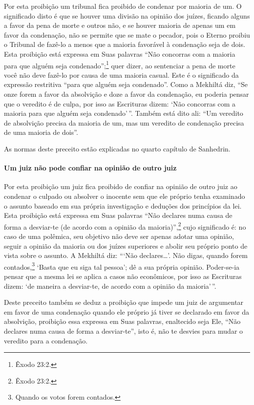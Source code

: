 Por esta proibição um tribunal fica proibido de condenar por maioria de
um. O significado disto é que se houver uma divisão na opinião dos
juízes, ficando alguns a favor da pena de morte e outros não, e se
houver maioria de apenas um em favor da condenação, não se permite que
se mate o pecador, pois o Eterno proibiu o Tribunal de fazê-lo a menos
que a maioria favorável à condenação seja de dois. Esta proibição está
expressa em Suas palavras ``Não concorras com a maioria para que alguém
seja condenado'';\footnote{Êxodo 23:2.} quer dizer, ao sentenciar a pena de morte
você não deve fazê-lo por causa de uma maioria casual. Este é o
significado da expressão restritiva ``para que alguém seja condenado''.
Como a Mekhiltá diz, ``Se onze forem a favor da absolvição e doze a
favor da condenação, eu poderia pensar que o veredito é de culpa, por
isso as Escrituras dizem: `Não concorras com a maioria para que alguém
seja condenado'\,''. Também está dito ali: ``Um veredito de absolvição
precisa da maioria de um, mas um veredito de condenação precisa de uma
maioria de dois''.

As normas deste preceito estão explicadas no quarto capítulo de Sanhedrin.

\paragraph{Um juiz não pode confiar na opinião de outro juiz}

Por esta proibição um juiz fica proibido de confiar na opinião de outro
juiz ao condenar o culpado ou absolver o inocente sem que ele próprio
tenha examinado o assunto baseado em sua própria investigação e deduções
dos princípios da lei. Esta proibição está expressa em Suas palavras
``Não declares numa causa de forma a desviar-te (de acordo com a
opinião da maioria)'',\footnote{Êxodo 23:2.} cujo significado é: no caso de uma
polêmica, seu objetivo não deve ser apenas adotar uma opinião, seguir a
opinião da maioria ou dos juízes superiores e abolir seu próprio ponto
de vista sobre o assunto. A Mekhiltá diz: ```Não declares\ldots{}'. Não
digas, quando forem contados,\footnote{Quando os votos forem contados.} `Basta que eu siga tal pessoa'; dê a sua própria opinião. Poder-se-ia pensar que a mesma
lei se aplica a casos não econômicos, por isso as Escrituras dizem: `de
maneira a desviar-te, de acordo com a opinião da maioria'\,''.

Deste preceito também se deduz a proibição que impede um juiz de
argumentar em favor de uma condenação quando ele próprio já tiver se
declarado em favor da absolvição, proibição essa expressa em Suas
palavras, enaltecido seja Ele, ``Não declares numa causa de forma a
desviar-te'', isto é, não te desvies para mudar o veredito para a
condenação.

